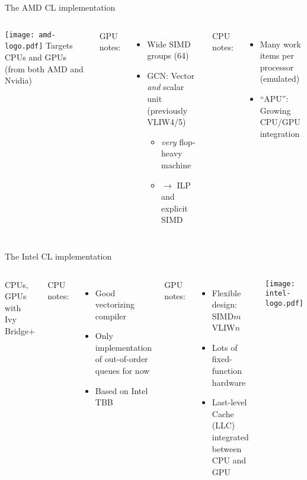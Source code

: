 \documentclass[english,compress]{beamer}
\begin{document}
\begin{frame}{The AMD CL implementation}
  \begin{columns}
      \texttt{[image: amd-logo.pdf]}
      Targets CPUs and GPUs (from both AMD and Nvidia)

      \medskip
      GPU notes:
      \begin{itemize}
        \item Wide SIMD groups (64)
        \item GCN: Vector \emph{and} scalar unit (previously VLIW4/5)
        \begin{itemize}
          \item \emph{very} flop-heavy machine
          \item $\rightarrow$ ILP and explicit SIMD
        \end{itemize}
      \end{itemize}

      CPU notes:
      \begin{itemize}
        \item Many work items per processor (emulated)
        \item ``APU'': Growing CPU/GPU integration
      \end{itemize}
  \end{columns}
\end{frame}

\begin{frame}{The Intel CL implementation}
  \begin{columns}
      CPUs, GPUs with Ivy Bridge+

      \medskip
      CPU notes:
      \begin{itemize}
        \item Good vectorizing compiler
        \item Only implementation of out-of-order queues for now
        \item Based on Intel TBB
      \end{itemize}
      GPU notes:
      \begin{itemize}
        \item Flexible design: SIMD$m$ VLIW$n$
        \item Lots of fixed-function hardware
        \item Last-level Cache (LLC) integrated between CPU and GPU
      \end{itemize}

      \texttt{[image: intel-logo.pdf]}
  \end{columns}
\end{frame}

\questionframe{}
\end{document}
